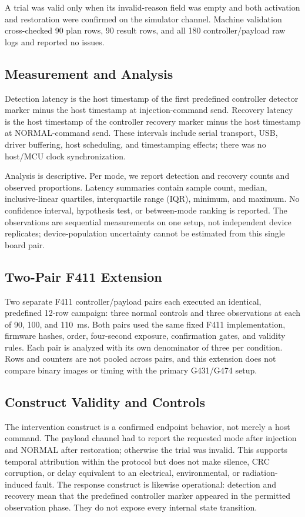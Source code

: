 \documentclass[conference]{IEEEtran}
\begin{document}
A trial was valid only when its invalid-reason field was empty and both activation and restoration were confirmed on the simulator channel. Machine validation cross-checked 90 plan rows, 90 result rows, and all 180 controller/payload raw logs and reported no issues.

\subsection{Measurement and Analysis}

Detection latency is the host timestamp of the first predefined controller detector marker minus the host timestamp at injection-command send. Recovery latency is the host timestamp of the controller recovery marker minus the host timestamp at NORMAL-command send. These intervals include serial transport, USB, driver buffering, host scheduling, and timestamping effects; there was no host/MCU clock synchronization.

Analysis is descriptive. Per mode, we report detection and recovery counts and observed proportions. Latency summaries contain sample count, median, inclusive-linear quartiles, interquartile range (IQR), minimum, and maximum. No confidence interval, hypothesis test, or between-mode ranking is reported. The observations are sequential measurements on one setup, not independent device replicates; device-population uncertainty cannot be estimated from this single board pair.

\subsection{Two-Pair F411 Extension}

Two separate F411 controller/payload pairs each executed an identical, predefined 12-row campaign: three normal controls and three observations at each of 90, 100, and 110~ms. Both pairs used the same fixed F411 implementation, firmware hashes, order, four-second exposure, confirmation gates, and validity rules. Each pair is analyzed with its own denominator of three per condition. Rows and counters are not pooled across pairs, and this extension does not compare binary images or timing with the primary G431/G474 setup.

\subsection{Construct Validity and Controls}

The intervention construct is a confirmed endpoint behavior, not merely a host command. The payload channel had to report the requested mode after injection and NORMAL after restoration; otherwise the trial was invalid. This supports temporal attribution within the protocol but does not make silence, CRC corruption, or delay equivalent to an electrical, environmental, or radiation-induced fault. The response construct is likewise operational: detection and recovery mean that the predefined controller marker appeared in the permitted observation phase. They do not expose every internal state transition.
\end{document}
